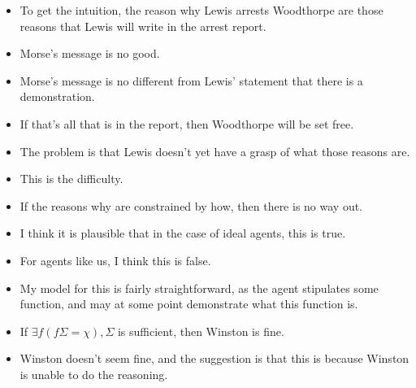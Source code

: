 \documentclass[10pt]{article}
\newcommand{\hozline}[0]{%
  \noindent\hdashrule[0.5ex][c]{\textwidth}{.1pt}{}
}
\newcommand{\hozlinedash}[0]{%
  \noindent\hdashrule[0.5ex][c]{\textwidth}{.1pt}{2.5pt}
}
\begin{document}
\begin{itemize}
\item To get the intuition, the reason why Lewis arrests Woodthorpe are those reasons that Lewis will write in the arrest report.
\item Morse's message is no good.
\item Morse's message is no different from Lewis' statement that there is a demonstration.
\item If that's all that is in the report, then Woodthorpe will be set free.
\item The problem is that Lewis doesn't yet have a grasp of what those reasons are.
\item This is the difficulty.
\item If the reasons why are constrained by how, then there is no way out.
\item I think it is plausible that in the case of ideal agents, this is true.
\item For agents like us, I think this is false.
\end{itemize}

\begin{itemize}
\item My model for this is fairly straightforward, as the agent stipulates some function, and may at some point demonstrate what this function is.
\end{itemize}

\hozlinedash

\begin{itemize}
\item If \(\exists f(f\Sigma = \chi), \Sigma\) is sufficient, then Winston is fine.
\item Winston doesn't seem fine, and the suggestion is that this is because Winston is unable to do the reasoning.
\end{itemize}

\hozline
\end{document}
